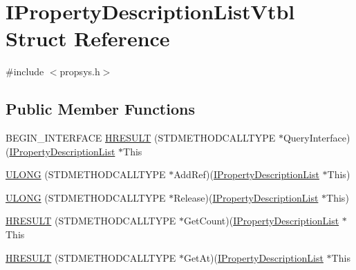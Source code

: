 \hypertarget{struct_i_property_description_list_vtbl}{}\section{I\+Property\+Description\+List\+Vtbl Struct Reference}
\label{struct_i_property_description_list_vtbl}


{\ttfamily \#include $<$propsys.\+h$>$}

\subsection*{Public Member Functions}
\begin{DoxyCompactItemize}
\item 
B\+E\+G\+I\+N\+\_\+\+I\+N\+T\+E\+R\+F\+A\+CE \hyperlink{struct_i_property_description_list_vtbl_afce0a10ff848209b14379b65128e3b6d}{H\+R\+E\+S\+U\+LT} (S\+T\+D\+M\+E\+T\+H\+O\+D\+C\+A\+L\+L\+T\+Y\+PE $\ast$Query\+Interface)(\hyperlink{propsys_8h_a8a2da78301baa8e2c2d8cc36a9eef9c0}{I\+Property\+Description\+List} $\ast$This
\item 
\hyperlink{struct_i_property_description_list_vtbl_abeeb6175667780cc886b691d51277675}{U\+L\+O\+NG} (S\+T\+D\+M\+E\+T\+H\+O\+D\+C\+A\+L\+L\+T\+Y\+PE $\ast$Add\+Ref)(\hyperlink{propsys_8h_a8a2da78301baa8e2c2d8cc36a9eef9c0}{I\+Property\+Description\+List} $\ast$This)
\item 
\hyperlink{struct_i_property_description_list_vtbl_a23ab57ed7c5845cb5f82c176737d600e}{U\+L\+O\+NG} (S\+T\+D\+M\+E\+T\+H\+O\+D\+C\+A\+L\+L\+T\+Y\+PE $\ast$Release)(\hyperlink{propsys_8h_a8a2da78301baa8e2c2d8cc36a9eef9c0}{I\+Property\+Description\+List} $\ast$This)
\item 
\hyperlink{struct_i_property_description_list_vtbl_a1aea7c1444eb8aa23fba9772fe67c6ef}{H\+R\+E\+S\+U\+LT} (S\+T\+D\+M\+E\+T\+H\+O\+D\+C\+A\+L\+L\+T\+Y\+PE $\ast$Get\+Count)(\hyperlink{propsys_8h_a8a2da78301baa8e2c2d8cc36a9eef9c0}{I\+Property\+Description\+List} $\ast$This
\item 
\hyperlink{struct_i_property_description_list_vtbl_a27150602606b9d41c2ea8d133bb04e84}{H\+R\+E\+S\+U\+LT} (S\+T\+D\+M\+E\+T\+H\+O\+D\+C\+A\+L\+L\+T\+Y\+PE $\ast$Get\+At)(\hyperlink{propsys_8h_a8a2da78301baa8e2c2d8cc36a9eef9c0}{I\+Property\+Description\+List} $\ast$This
\end{DoxyCompactItemize}
